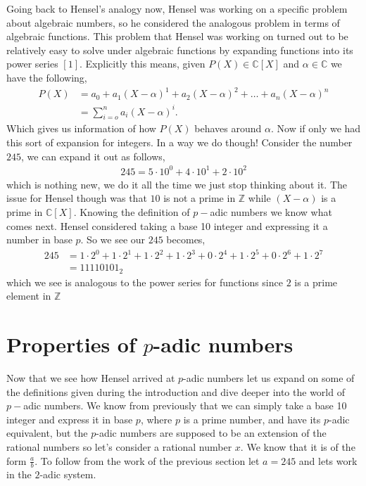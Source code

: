 \documentclass[12pt]{article}
\theoremstyle{definition}
\theoremstyle{remark}
\newcommand{\zz}{\mathbb Z}   %
\newcommand{\cc}{\mathbb C}   %
\newcommand{\lrb}[1]{\left[#1\right]}
\begin{document}
Going back to Hensel's analogy now, Hensel was working on a specific problem about algebraic numbers, so he considered the analogous problem in terms of algebraic functions. This problem that Hensel was working on turned out to be relatively easy to solve under algebraic functions by expanding functions into its power series $\lrb{1}$. Explicitly this means, given $P(X) \in \cc[X]$ and $\alpha \in \cc$ we have the following,
\begin{align*}
  P(X) &= a_0 + a_1(X -\alpha)^{1} + a_2(X-\alpha)^{2} + \dots + a_n(X-\alpha)^{n} \\
  &= \sum_{i = o}^{n}a_i(X-\alpha)^{i}.
\end{align*}
Which gives us information of how $P(X)$ behaves around $\alpha$. Now if only we had this sort of expansion for integers. In a way we do though! Consider the number $245$, we can expand it out as follows,
\begin{align*}
  245 = 5\cdot 10^{0} + 4\cdot 10^{1} + 2 \cdot 10^{2}
\end{align*}
which is nothing new, we do it all the time we just stop thinking about it. The issue for Hensel though was that $10$ is not a prime in $\zz$ while $(X-\alpha)$ is a prime in $\cc[X]$. Knowing the definition of $p-$adic numbers we know what comes next. Hensel considered taking a base 10 integer and expressing it a number in base $p$. So we see our $245$ becomes,
\begin{align*}
  245 &= 1 \cdot 2^{0} + 1\cdot 2^{1} + 1 \cdot 2^{2} + 1\cdot 2^{3} + 0\cdot 2^{4} + 1 \cdot 2^{5} + 0 \cdot 2^{6} + 1\cdot 2^{7} \\
  &= 11110101_2
\end{align*}
which we see is analogous to the power series for functions since $2$ is a prime element in $\zz$

\section{Properties of $p$-adic numbers}
Now that we see how Hensel arrived at $p$-adic numbers let us expand on some of the definitions given during the introduction and dive deeper into the world of $p-$adic numbers. We know from previously that we can simply take a base 10 integer and express it in base $p$, where $p$ is a prime number, and have its $p$-adic equivalent, but the $p$-adic numbers are supposed to be an extension of the rational numbers so let's consider a rational number $x$. We know that it is of the form $\frac{a}{b}$. To follow from the work of the previous section let $a = 245$ and lets work in the $2$-adic system. 
\end{document}
